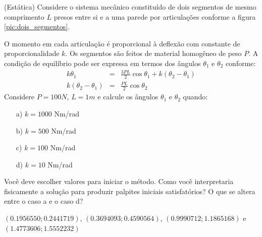 \begin{exer}{(Estática)}\label{prob:dois_segmentos} Considere o sistema mecânico constituído de dois segmentos de mesmo comprimento $L$ presos entre si e a uma parede por articulações conforme a figura \ref{pic:dois_segmentos}.

O momento em cada articulação é proporcional à deflexão com constante de proporcionalidade $k$. Os segmentos são feitos de material homogêneo de peso $P$. A condição de equilíbrio pode ser expressa em termos dos ângulos $\theta_1$ e $\theta_2$ conforme:
\begin{eqnarray*}
k\theta_1&=& \frac{3PL}{2}\cos\theta_1 + k\left(\theta_2-\theta_1\right)\\
k\left(\theta_2-\theta_1\right)&=& \frac{PL}{2}\cos\theta_2
\end{eqnarray*}
Considere $P=100N$, $L=1m$ e calcule os ângulos $\theta_1$ e $\theta_2$ quando:
\begin{itemize}
\item[a)] $k=1000$ Nm/rad
\item[b)] $k=500$ Nm/rad
\item[c)] $k=100$ Nm/rad
\item[d)] $k=10$ Nm/rad
\end{itemize}
Você deve escolher valores para iniciar o método. Como você interpretaria fisicamente a solução para produzir palpites iniciais satisfatórios? O que se altera entre o caso a e o caso d?
\end{exer}

\begin{resp}
$\left(0.1956550;0.2441719 \right)$, $\left(0.3694093;0.4590564\right) $, $\left( 0.9990712;1.1865168  \right)$ e $\left(1.4773606;1.5552232 \right)$
\end{resp}


